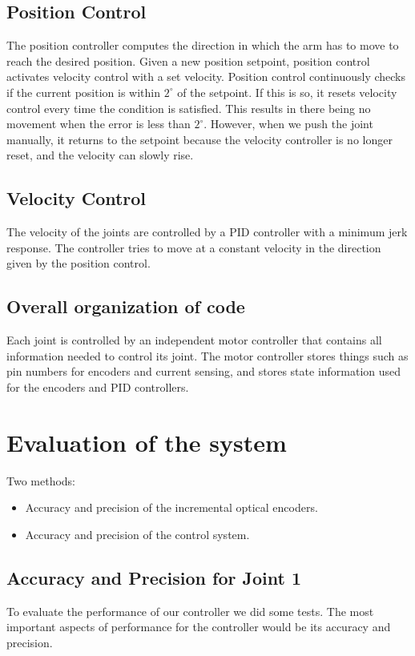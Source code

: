 \documentclass[10pt,a4paper]{article}
\begin{document}
\subsection{Position Control}
The position controller computes the direction in which the arm has to
move to reach the desired position. Given a new position setpoint,
position control activates velocity control with a set
velocity. Position control continuously checks if the current position
is within \( 2^{\circ}\) of the setpoint. If this is so, it resets
velocity control every time the condition is satisfied. This results
in there being no movement when the error is less than \(
2^{\circ}\). However, when we push the joint manually, it returns to
the setpoint because the velocity controller is no longer reset, and
the velocity can slowly rise.

\subsection{Velocity Control}
The velocity of the joints are controlled by a PID controller with a
minimum jerk response. The controller tries to move at a constant
velocity in the direction given by the position control.

\subsection{Overall organization of code}
Each joint is controlled by an independent motor controller that
contains all information needed to control its joint. The motor
controller stores things such as pin numbers for encoders and current
sensing, and stores state information used for the encoders and PID
controllers.

\section{Evaluation of the system}
Two methods:
\begin{itemize}
\item Accuracy and precision of the incremental optical encoders.
\item Accuracy and precision of the control system.
\end{itemize}

\subsection{Accuracy and Precision for Joint 1}
To evaluate the performance of our controller we did some tests. The most important aspects of performance for the controller would be its accuracy and precision. \\
\end{document}

